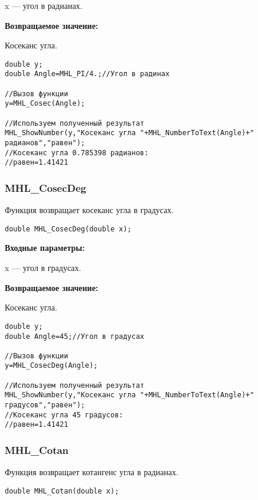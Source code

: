 \documentclass[a4paper,12pt]{article}
\begin{document}
 x --- угол в радианах.

\textbf{Возвращаемое значение:}

Косеканс угла.


\begin{lstlisting}[label=code_use_MHL_Cosec,caption=Пример использования]
double y;
double Angle=MHL_PI/4.;//Угол в радинах

//Вызов функции
y=MHL_Cosec(Angle);

//Используем полученный результат
MHL_ShowNumber(y,"Косеканс угла "+MHL_NumberToText(Angle)+" радианов","равен");
//Косеканс угла 0.785398 радианов:
//равен=1.41421
\end{lstlisting}

\subsubsection{MHL\_CosecDeg}\label{MHL_CosecDeg}

Функция возвращает косеканс угла в градусах.


\begin{lstlisting}[label=code_syntax_MHL_CosecDeg,caption=Синтаксис]
double MHL_CosecDeg(double x);
\end{lstlisting}

\textbf{Входные параметры:}

 x --- угол в градусах.

\textbf{Возвращаемое значение:}

Косеканс угла.


\begin{lstlisting}[label=code_use_MHL_CosecDeg,caption=Пример использования]
double y;
double Angle=45;//Угол в градусах

//Вызов функции
y=MHL_CosecDeg(Angle);

//Используем полученный результат
MHL_ShowNumber(y,"Косеканс угла "+MHL_NumberToText(Angle)+" градусов","равен");
//Косеканс угла 45 градусов:
//равен=1.41421
\end{lstlisting}

\subsubsection{MHL\_Cotan}\label{MHL_Cotan}

Функция возвращает котангенс угла в радианах.


\begin{lstlisting}[label=code_syntax_MHL_Cotan,caption=Синтаксис]
double MHL_Cotan(double x);
\end{lstlisting}
\end{document}
